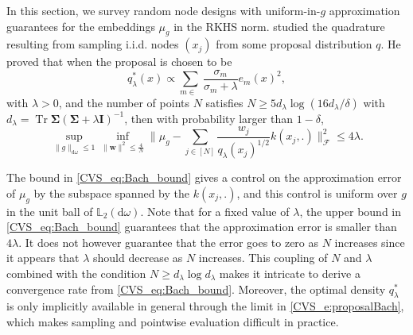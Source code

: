 \documentclass[twoside,11pt]{book}
\numberwithin{theorem}{chapter}
\numberwithin{definition}{chapter}
\numberwithin{proposition}{chapter}
\numberwithin{corollary}{chapter}
\numberwithin{example}{chapter}
\numberwithin{lemma}{chapter}
\numberwithin{assumption}{chapter}
\DeclareMathOperator{\Tr}{Tr}
\DeclareMathOperator{\Ns}{\mathbb{N}^{*}}
\newcommand{\pc}[1]{\textcolor{blue}{#1}}
\newcommand{\rb}[1]{\textcolor{magenta}{#1}}
\begin{document}
In this section, we survey random node designs with uniform-in-$g$ approximation guarantees for the embeddings $\mu_{g}$ in the RKHS norm.
\cite{Bac17} studied the quadrature resulting from sampling i.i.d. nodes $(x_j)$ from some proposal distribution $q$. He proved that when the proposal is chosen to be
\begin{equation}
	q_{\lambda}^*(x) \propto \sum\limits_{m \in \Ns} \frac{\sigma_{m}}{\sigma_{m}+\lambda} e_{m}(x)^{2},
\label{CVS_e:proposalBach}
\end{equation}
with $\lambda >0$,
and the number of points $N$ satisfies $N \geq 5 d_\lambda \log(16 d_\lambda / \delta)$ with $d_\lambda = \Tr \bm{\Sigma}(\bm{\Sigma} + \lambda \bm{I})^{-1}$, then with probability larger than $1-\delta$,
\begin{equation}\label{CVS_eq:Bach_bound}
\sup\limits_{\|g\|_{\mathrm{d}\omega} \leq 1} \inf\limits_{ \|\bm{w}\|^{2}\leq \frac{4}{N}} \Big\| \mu_{g} - \sum\limits_{j \in [N]} \frac{w_{j}}{q_\lambda(x_{j})^{1/2}} k(x_{j},.)\Big\|_{\mathcal{F}}^{2} \leq 4\lambda .
\end{equation}

The bound in \eqref{CVS_eq:Bach_bound} gives a control on the approximation error of $\mu_{g}$ by the subspace spanned by the $k(x_{j},.)$, and this control is uniform over $g$ in the unit ball of $\mathbb{L}_{2}(\mathrm{d}\omega)$.
Note that for a fixed value of $\lambda$, the upper bound in \eqref{CVS_eq:Bach_bound} guarantees that the approximation error is smaller than $4\lambda$. It does not however guarantee that the error goes to zero as $N$ increases since it appears that $\lambda$ should decrease as $N$ increases.
This coupling of $N$ and $\lambda$ combined with the condition $N \geq d_{\lambda} \log d_{\lambda}$ makes it intricate to derive a convergence rate from \eqref{CVS_eq:Bach_bound}.
 Moreover, the optimal density $q_{\lambda}^*$ is only implicitly available in general through the limit in \eqref{CVS_e:proposalBach}, which makes sampling and pointwise evaluation difficult in practice.
\end{document}
